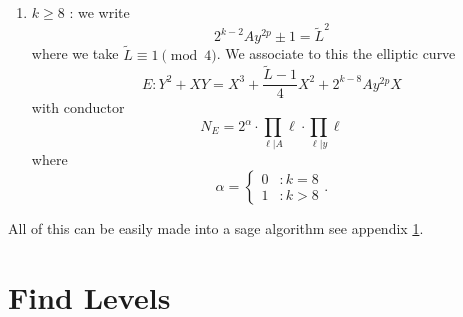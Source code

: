\documentclass[12pt]{article}
\begin{document}
\begin{enumerate}
\begin{enumerate}
\item $k \geq 8$ : we write
\[ 2^{k-2} A y^{2p} \pm 1  = \tilde{L}^2 \]
where we take $\tilde{L} \equiv 1 \pmod{4}$.  We associate to this the elliptic curve
\[ E: Y^2 + XY = X^3 + \frac{\tilde{L} -1}{4}X^2 + 2^{k-8}Ay^{2p}X \]
with conductor
\[ N_E = 2^\alpha \cdot \prod_{\ell | A} \ell \cdot \prod_{\ell | y} \ell \]
where 
\[ \alpha = \begin{cases} 0 & : k = 8 \\ 1 & : k > 8 \end{cases} .\]



\end{enumerate}

All of this can be easily made into a sage algorithm see appendix \ref{findlevels}.



\end{enumerate}











\appendix


\section{Find Levels}\label{findlevels}
\end{document}
